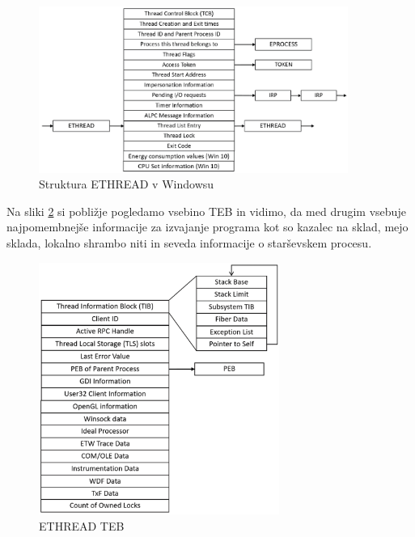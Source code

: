 \documentclass[a4paper,12pt,openright]{book}
\begin{document}
\begin{figure}[h!]
	\begin{center}
		\includegraphics[width=0.9\textwidth]{images/windows_ethread.png}
	\end{center}
	\caption{Struktura ETHREAD v Windowsu \cite{Yosifovich_Russinovich_Solomon_Ionescu_2017}}
	\label{fig:windows_ethread}
\end{figure}

Na sliki \ref{fig:windows_ethread_tib} si pobližje pogledamo vsebino TEB in vidimo, da med drugim vsebuje najpomembnejše informacije za izvajanje programa kot so kazalec na sklad, mejo sklada, lokalno shrambo niti in seveda informacije o starševskem procesu.

\begin{figure}[h!]
	\begin{center}
		\includegraphics[width=0.7\textwidth]{images/windows_ethread_teb.png}
	\end{center}
	\caption{ETHREAD TEB \cite{Yosifovich_Russinovich_Solomon_Ionescu_2017}}
	\label{fig:windows_ethread_tib}
\end{figure}
\end{document}
